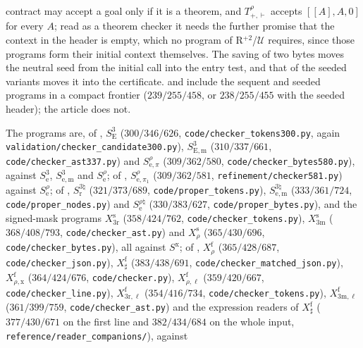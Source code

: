 \begin{remark}
\begin{itemize}
contract may accept a goal only if it is a theorem, and $T^{\rho}_{+,\vdash}$ accepts
$[[A],A,0]$ for every $A$; read as a theorem checker it needs the further promise that the
context in the header is empty, which no program of R$^{+2}$/$\mathcal U$ requires, since
those programs form their initial context themselves. The saving of two bytes moves the
neutral seed from the initial call into the entry test, and that of the seeded variants
moves it into the certificate.  and 
include the sequent and seeded programs in a compact frontier ($239/255/458$, or
$238/255/455$ with the seeded header); the article does not.
\end{itemize}
\end{remark}

The programs are, of , $S^{3}_{\mathrm E}$ ($300/346/626$,
\texttt{code/checker\_tokens300.py}, again \texttt{validation/checker\_candidate300.py}),
$S^{3}_{\mathrm{E,m}}$ ($310/337/661$, \texttt{code/checker\_ast337.py}) and
$S^{\rho}_{\mathrm e,\pi}$ ($309/362/580$, \texttt{code/checker\_bytes580.py}), against
$S^{3}_{\mathrm e}$, $S^{3}_{\mathrm{e,m}}$ and $S^{\rho}_{\mathrm e}$; of
, $S^{\rho}_{\mathrm e,\pi_1}$ ($309/362/581$,
\texttt{refinement/checker581.py}) against $S^{\rho}_{\mathrm e}$; of ,
$S^{3\natural}_{\mathrm r}$ ($321/373/689$, \texttt{code/proper\_tokens.py}),
$S^{3\natural}_{\mathrm{e,m}}$ ($333/361/724$, \texttt{code/proper\_nodes.py}) and
$S^{\rho\natural}_{\mathrm e}$ ($330/383/627$, \texttt{code/proper\_bytes.py}), and the
signed-mask programs $X^{\mathrm s}_{3\mathrm r}$ ($358/424/762$,
\texttt{code/checker\_tokens.py}), $X^{\mathrm s}_{3\mathrm m}$ ($368/408/793$,
\texttt{code/checker\_ast.py}) and $X^{\mathrm s}_{\rho}$ ($365/430/696$,
\texttt{code/checker\_bytes.py}), all against $S^{\mathrm x}$; of ,
$X^{\mathrm f}_{\rho}$ ($365/428/687$, \texttt{code/checker\_json.py}),
$X^{\mathrm f}_{\sharp}$ ($383/438/691$, \texttt{code/checker\_matched\_json.py}),
$X^{\mathrm f}_{\rho,\mathrm x}$ ($364/424/676$, \texttt{code/checker.py}),
$X^{\mathrm f}_{\rho,\ell}$ ($359/420/667$, \texttt{code/checker\_line.py}),
$X^{\mathrm f}_{3\mathrm r,\ell}$ ($354/416/734$, \texttt{code/checker\_tokens.py}),
$X^{\mathrm f}_{3\mathrm m,\ell}$ ($361/399/759$, \texttt{code/checker\_ast.py}) and the
expression readers of $X^{\mathrm f}_{\sharp}$ ($377/430/671$ on the first line and
$382/434/684$ on the whole input, \texttt{reference/reader\_companions/}), against
